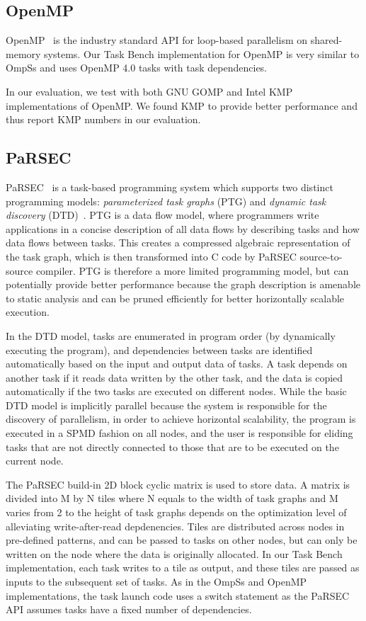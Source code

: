 \subsection{OpenMP}

OpenMP~\cite{OpenMPSpec40} is the industry standard API for loop-based
parallelism on shared-memory systems. Our Task Bench implementation
for OpenMP is very similar to OmpSs and uses OpenMP 4.0 tasks with
task dependencies.

In our evaluation, we test with both GNU GOMP and Intel KMP
implementations of OpenMP. We found KMP to provide better performance
and thus report KMP numbers in our evaluation.

\subsection{PaRSEC}

PaRSEC~\cite{PARSEC13} is a task-based programming system which
supports two distinct programming models: \emph{parameterized task
  graphs} (PTG) and \emph{dynamic task discovery} (DTD)~\cite{PARSEC_DTD}. 
PTG is a data flow model, where programmers write applications 
in a concise description of all data flows by describing tasks 
and how data flows between tasks. This creates a compressed algebraic
representation of the task graph, which is then transformed into C 
code by PaRSEC source-to-source compiler. PTG is therefore a more limited
programming model, but can potentially provide better performance
because the graph description is amenable to static analysis and can
be pruned efficiently for better horizontally scalable execution.

In the DTD model, tasks are enumerated in program order (by
dynamically executing the program), and dependencies between tasks are
identified automatically based on the input and output data of tasks. 
A task depends on another task if it reads data written by the other task,
and the data is copied automatically if the two tasks are executed on
different nodes. While the basic DTD model is implicitly parallel
because the system is responsible for the discovery of parallelism, in
order to achieve horizontal scalability, the program is executed in a
SPMD fashion on all nodes, and the user is responsible for eliding
tasks that are not directly connected to those that are to be executed
on the current node.

The PaRSEC build-in 2D block cyclic matrix is used to store data. 
A matrix is divided into M by N tiles where N equals to the width of
task graphs and M varies from 2 to the height of task graphs depends
on the optimization level of alleviating write-after-read depdenencies. 
Tiles are distributed across nodes in pre-defined patterns, 
and can be passed to tasks on other nodes, but
can only be written on the node where the data is originally
allocated. In our Task Bench implementation, each task writes to a
tile as output, and these tiles are passed as inputs to the
subsequent set of tasks. As in the OmpSs and OpenMP implementations,
the task launch code uses a switch statement as the PaRSEC API assumes
tasks have a fixed number of dependencies.

